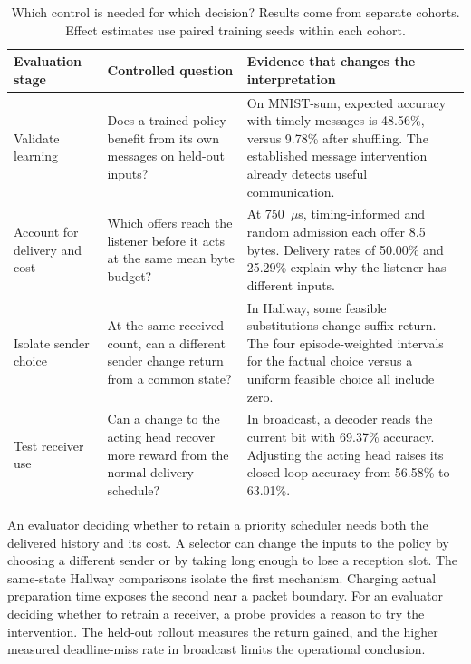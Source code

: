 \documentclass[a4paper,fleqn]{cas-dc}
\begin{document}
\begin{table}[pos=t]
\centering\small
\caption{Which control is needed for which decision? Results come from separate cohorts. Effect estimates use paired training seeds within each cohort.}
\label{tab:evaluation_protocol}
\begin{tabularx}{\textwidth}{@{}p{}XX@{}}
\toprule
Evaluation stage & Controlled question & Evidence that changes the interpretation\\
\midrule
Validate learning & Does a trained policy benefit from its own messages on held-out inputs? & On MNIST-sum, expected accuracy with timely messages is 48.56\%, versus 9.78\% after shuffling. The established message intervention already detects useful communication.\\[3pt]
Account for delivery and cost & Which offers reach the listener before it acts at the same mean byte budget? & At 750~$\mu$s, timing-informed and random admission each offer 8.5 bytes. Delivery rates of 50.00\% and 25.29\% explain why the listener has different inputs.\\[3pt]
Isolate sender choice & At the same received count, can a different sender change return from a common state? & In Hallway, some feasible substitutions change suffix return. The four episode-weighted intervals for the factual choice versus a uniform feasible choice all include zero.\\[3pt]
Test receiver use & Can a change to the acting head recover more reward from the normal delivery schedule? & In broadcast, a decoder reads the current bit with 69.37\% accuracy. Adjusting the acting head raises its closed-loop accuracy from 56.58\% to 63.01\%.\\
\bottomrule
\end{tabularx}
\end{table}

An evaluator deciding whether to retain a priority scheduler needs both the delivered history and its cost. A selector can change the inputs to the policy by choosing a different sender or by taking long enough to lose a reception slot. The same-state Hallway comparisons isolate the first mechanism. Charging actual preparation time exposes the second near a packet boundary. For an evaluator deciding whether to retrain a receiver, a probe provides a reason to try the intervention. The held-out rollout measures the return gained, and the higher measured deadline-miss rate in broadcast limits the operational conclusion.
\end{document}
